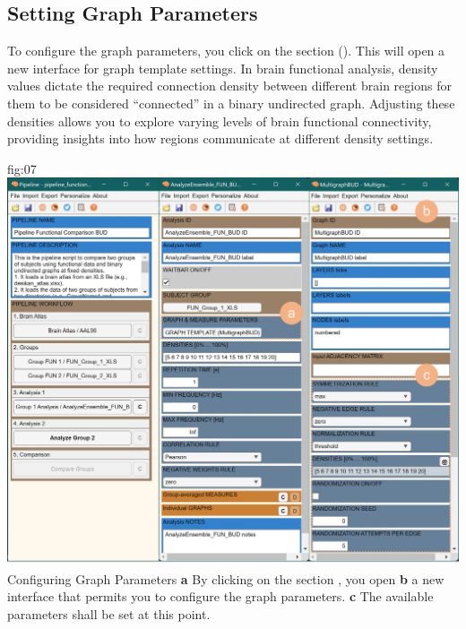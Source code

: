 \documentclass[justified]{tufte-handout}
\begin{document}

\subsection{Setting Graph Parameters}

To configure the graph parameters, you click on the section  (). This will open a new interface for graph template settings. 
In brain functional analysis, density values dictate the required connection density between different brain regions for them to be considered “connected” in a binary undirected graph. 
Adjusting these densities allows you to explore varying levels of brain functional connectivity, providing insights into how regions communicate at different density settings.

	{fig:07}
	{
	\includegraphics{fig07.jpg}
	}
	{Configuring Graph Parameters}
	{
	{\bf a} By clicking on the section , you open {\bf b} a new interface that permits you to configure the graph parameters.
	{\bf c} The available parameters shall be set at this point.
	}

\end{document}
